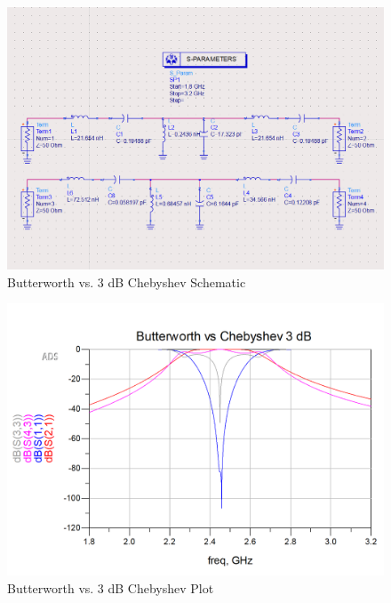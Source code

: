 \documentclass{article}
\begin{document}
\begin{figure}[h!]
    \centering
    \includegraphics[scale=0.4]{images/butterworth_vs_chebyshev3pt0_schematic.png}
    \caption{Butterworth vs. 3 dB Chebyshev Schematic}
    \label{fig:20}
\end{figure}
\begin{figure}[h!]
    \centering
    \includegraphics[scale=0.3]{images/butterworth_vs_chebyshev3pt0_plot.png}
    \caption{Butterworth vs. 3 dB Chebyshev Plot}
    \label{fig:21}
\end{figure}
\end{document}
